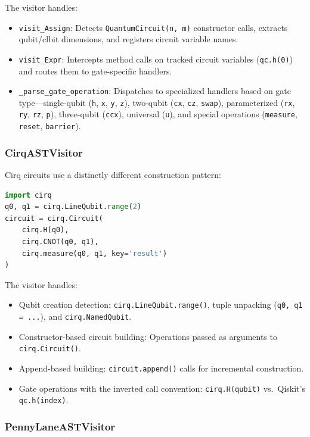 \documentclass[conference]{IEEEtran}
\begin{document}
The visitor handles:
\begin{itemize}
    \item \texttt{visit\_Assign}: Detects \texttt{QuantumCircuit(n, m)} constructor calls, extracts qubit/clbit dimensions, and registers circuit variable names.
    \item \texttt{visit\_Expr}: Intercepts method calls on tracked circuit variables (\texttt{qc.h(0)}) and routes them to gate-specific handlers.
    \item \texttt{\_parse\_gate\_operation}: Dispatches to specialized handlers based on gate type---single-qubit (\texttt{h}, \texttt{x}, \texttt{y}, \texttt{z}), two-qubit (\texttt{cx}, \texttt{cz}, \texttt{swap}), parameterized (\texttt{rx}, \texttt{ry}, \texttt{rz}, \texttt{p}), three-qubit (\texttt{ccx}), universal (\texttt{u}), and special operations (\texttt{measure}, \texttt{reset}, \texttt{barrier}).
\end{itemize}

\subsubsection{CirqASTVisitor}

Cirq circuits use a distinctly different construction pattern:
\begin{lstlisting}[language=Python, caption={Typical Cirq circuit construction pattern}]
import cirq
q0, q1 = cirq.LineQubit.range(2)
circuit = cirq.Circuit(
    cirq.H(q0),
    cirq.CNOT(q0, q1),
    cirq.measure(q0, q1, key='result')
)
\end{lstlisting}

The visitor handles:
\begin{itemize}
    \item Qubit creation detection: \texttt{cirq.LineQubit.range()}, tuple unpacking (\texttt{q0, q1 = ...}), and \texttt{cirq.NamedQubit}.
    \item Constructor-based circuit building: Operations passed as arguments to \texttt{cirq.Circuit()}.
    \item Append-based building: \texttt{circuit.append()} calls for incremental construction.
    \item Gate operations with the inverted call convention: \texttt{cirq.H(qubit)} vs.\ Qiskit's \texttt{qc.h(index)}.
\end{itemize}

\subsubsection{PennyLaneASTVisitor}
\end{document}
